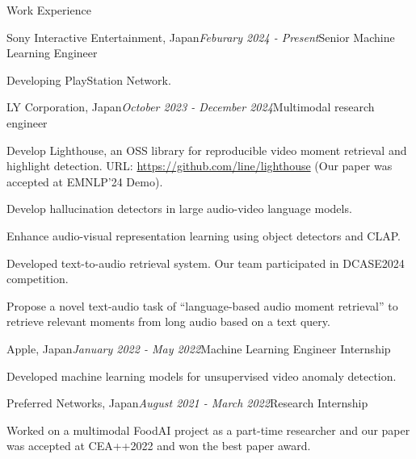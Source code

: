 \begin{rSection}{Work Experience}

\begin{rSubsection}{Sony Interactive Entertainment, Japan}{\em Feburary 2024 - Present}{Senior Machine Learning Engineer}{}
\item Developing PlayStation Network.
\end{rSubsection}

\begin{rSubsection}{LY Corporation, Japan}{\em October 2023 - December 2024}{Multimodal research engineer}{}
\item Develop Lighthouse, an OSS library for reproducible video moment retrieval and highlight detection. URL: \url{https://github.com/line/lighthouse} (Our paper was accepted at EMNLP'24 Demo).
\item Develop hallucination detectors in large audio-video language models.
\item Enhance audio-visual representation learning using object detectors and CLAP.
\item Developed text-to-audio retrieval system. Our team participated in DCASE2024 competition.
\item Propose a novel text-audio task of ``language-based audio moment retrieval'' to retrieve relevant moments from long audio based on a text query.
\end{rSubsection}
\vspace{-0.5em}

\begin{rSubsection}{Apple, Japan}{\em January 2022 - May 2022}{Machine Learning Engineer Internship}{}
\item Developed machine learning models for unsupervised video anomaly detection.
\end{rSubsection}
\vspace{-0.5em}

\begin{rSubsection}{Preferred Networks, Japan}{\em August 2021 - March 2022}{Research Internship}{}
\item Worked on a multimodal FoodAI project as a part-time researcher and our paper was accepted at CEA++2022 and won the best paper award.
\end{rSubsection}
\vspace{-0.5em}

\end{rSection}
